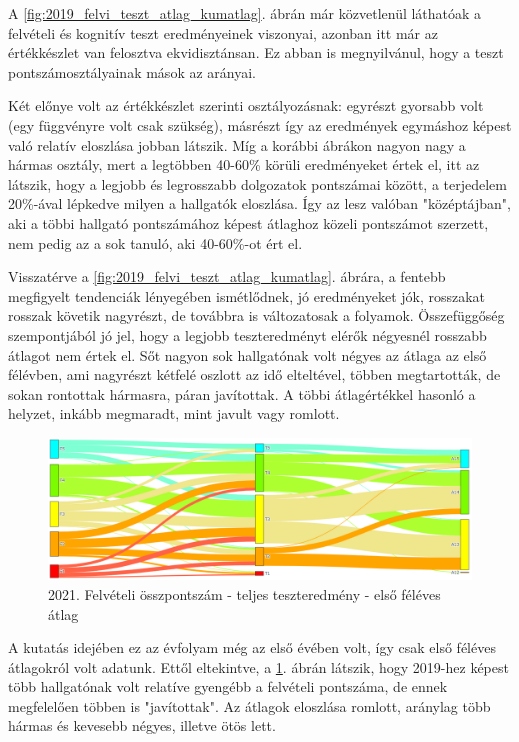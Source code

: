\documentclass[12pt]{article}
\begin{document}
A \ref{fig:2019_felvi_teszt_atlag_kumatlag}. ábrán már közvetlenül láthatóak a felvételi és kognitív teszt eredményeinek viszonyai, azonban itt már az értékkészlet van felosztva ekvidisztánsan. Ez abban is megnyilvánul, hogy a teszt pontszámosztályainak mások az arányai. 

Két előnye volt az értékkészlet szerinti osztályozásnak: egyrészt gyorsabb volt (egy függvényre volt csak szükség), másrészt így az eredmények egymáshoz képest való relatív eloszlása jobban látszik. Míg a korábbi ábrákon nagyon nagy a hármas osztály, mert a legtöbben 40-60\% körüli eredményeket értek el, itt az látszik, hogy a legjobb és legrosszabb dolgozatok pontszámai között, a terjedelem 20\%-ával lépkedve milyen a hallgatók eloszlása. Így az lesz valóban "középtájban", aki a többi hallgató pontszámához képest átlaghoz közeli pontszámot szerzett, nem pedig az a sok tanuló, aki 40-60\%-ot ért el.

Visszatérve a \ref{fig:2019_felvi_teszt_atlag_kumatlag}. ábrára, a fentebb megfigyelt tendenciák lényegében ismétlődnek, jó eredményeket jók, rosszakat rosszak követik nagyrészt, de továbbra is változatosak a folyamok. Összefüggőség szempontjából jó jel, hogy a legjobb teszteredményt elérők négyesnél rosszabb átlagot nem értek el. Sőt nagyon sok hallgatónak volt négyes az átlaga az első félévben, ami nagyrészt kétfelé oszlott az idő elteltével, többen megtartották, de sokan rontottak hármasra, páran javítottak. A többi átlagértékkel hasonló a helyzet, inkább megmaradt, mint javult vagy romlott.


\begin{figure}[H]
\centering
\includegraphics[width = \textwidth]{kepek/2021_felvi_teszt_atlag.png}
\caption{2021. Felvételi összpontszám - teljes teszteredmény - első féléves átlag}
\label{fig:2021_felvi_teszt_atlag}
\end{figure}

A kutatás idejében ez az évfolyam még az első évében volt, így csak első féléves átlagokról volt adatunk. Ettől eltekintve, a \ref{fig:2021_felvi_teszt_atlag}. ábrán látszik, hogy 2019-hez képest több hallgatónak volt relatíve gyengébb a felvételi pontszáma, de ennek megfelelően többen is "javítottak". Az átlagok eloszlása romlott, aránylag több hármas és kevesebb négyes, illetve ötös lett. 
\end{document}
